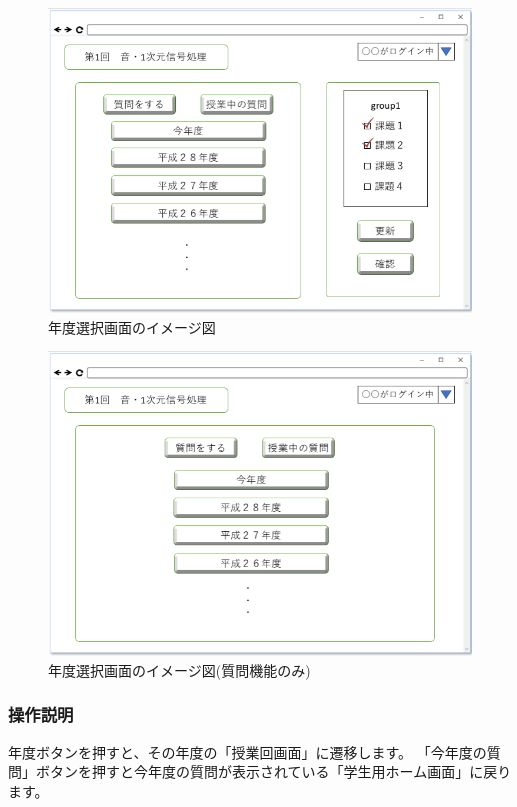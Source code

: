 \begin{figure}[htbp]
\begin{center}
  \includegraphics[width=1\linewidth,clip]{./img/30.png}
  \caption{年度選択画面のイメージ図}\label{fig:30}
\end{center}
\end{figure}

\begin{figure}[htbp]
\begin{center}
  \includegraphics[width=1\linewidth,clip]{./img/31.png}
  \caption{年度選択画面のイメージ図(質問機能のみ)}\label{fig:31}
\end{center}
\end{figure}

\subsubsection{操作説明}
年度ボタンを押すと、その年度の「授業回画面」に遷移します。
「今年度の質問」ボタンを押すと今年度の質問が表示されている「学生用ホーム画面」に戻ります。

